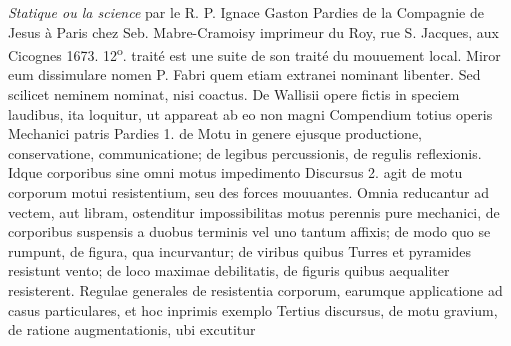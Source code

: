 \vspace*{8mm}
\pstart 
\normalsize
\noindent [128~v\textsuperscript{o}] \textit{Statique ou la science } par le R. P. Ignace Gaston Pardies\protect{} de la Compagnie de Jesus \`{a} Paris chez Seb. Mabre-Cramoisy\protect{} imprimeur du Roy, rue S. Jacques, aux Cicognes 1673. 12\textsuperscript{o}.  trait\'{e} est une suite de son trait\'{e} du mouuement local. Miror eum dissimulare nomen P. Fabri\protect{} quem etiam extranei nominant libenter. Sed scilicet neminem nominat, nisi coactus. De Wallisii\protect{} opere fictis in speciem laudibus, ita loquitur, ut appareat ab eo non magni  
\pend
\pstart Compendium totius operis Mechanici patris Pardies\protect{} 1. de Motu in genere ejusque productione, conservatione, communicatione; de legibus percussionis, de regulis reflexionis. Idque corporibus sine omni motus impedimento  Discursus 2. agit de motu corporum motui resistentium, seu des forces mouuantes. Omnia reducantur ad vectem, aut libram, ostenditur impossibilitas motus perennis pure mechanici, de corporibus suspensis a duobus terminis vel uno tantum affixis; de modo quo se rumpunt, de figura,  qua incurvantur; de viribus quibus Turres et pyramides resistunt vento; de loco maximae debilitatis, de figuris quibus aequaliter resisterent. Regulae generales de resistentia corporum, earumque applicatione ad casus particulares, et hoc inprimis exemplo  
\pend 
\count{}
\count{}
\pstart Tertius discursus, de motu gravium, de ratione augmentationis, ubi excutitur
